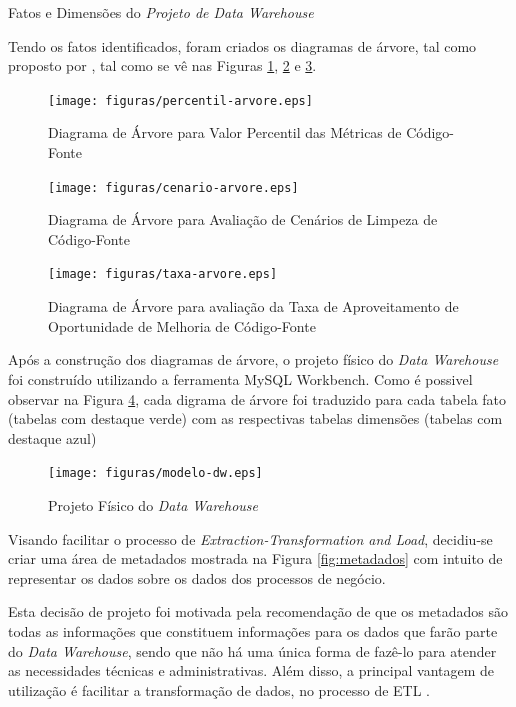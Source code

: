 \begin{table}[h]
\centering

\caption{Fatos e Dimensões do \textit{Projeto de Data Warehouse} }
\label{tab:dimensoes-fato}
\end{table}
\FloatBarrier

Tendo os fatos identificados, foram criados os diagramas de árvore, tal como proposto por , tal como se vê nas Figuras \ref{fig:percentil-arvore}, \ref{fig:cenario-arvore} e \ref{fig:taxa-arvore}.

\begin{figure}[h]
\centering
\texttt{[image: figuras/percentil-arvore.eps]}
\caption{Diagrama de Árvore para Valor Percentil das Métricas de Código-Fonte}
\label{fig:percentil-arvore}
\end{figure}
\FloatBarrier


\begin{figure}[h]
\centering
\texttt{[image: figuras/cenario-arvore.eps]}
\caption{Diagrama de Árvore para Avaliação de Cenários de Limpeza de Código-Fonte}
\label{fig:cenario-arvore}
\end{figure}
\FloatBarrier


\begin{figure}[ht!]
\centering
\texttt{[image: figuras/taxa-arvore.eps]}
\caption{Diagrama de Árvore para avaliação da Taxa de Aproveitamento de Oportunidade de Melhoria de Código-Fonte}
\label{fig:taxa-arvore}
\end{figure}
\FloatBarrier


Após a construção dos diagramas de árvore, o projeto físico do \textit{Data Warehouse} foi construído utilizando a ferramenta MySQL Workbench. Como é possivel observar na Figura \ref{fig:project-dw}, cada digrama de árvore foi traduzido para cada tabela fato (tabelas com destaque verde) com as respectivas tabelas dimensões (tabelas com destaque azul)


\begin{figure}[ht!]
\centering
\texttt{[image: figuras/modelo-dw.eps]}
\caption{Projeto Físico do \textit{Data Warehouse}}
\label{fig:project-dw}
\end{figure}
\FloatBarrier

Visando facilitar o processo de \textit{Extraction-Transformation and Load}, decidiu-se criar uma área de metadados mostrada na Figura \ref{fig:metadados} com intuito de representar os dados sobre os dados dos processos de negócio.

Esta decisão de projeto foi motivada pela recomendação de que os metadados são todas as informações que constituem informações para os dados que farão parte do \textit{Data Warehouse}, sendo que não há uma única forma de fazê-lo para atender as necessidades técnicas e administrativas. Além disso, a principal vantagem de utilização é facilitar a transformação de dados, no processo de ETL \cite{Kimball2002}.


